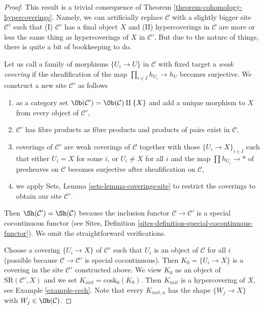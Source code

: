 \begin{proof}
This result is a trivial consequence of
Theorem \ref{theorem-cohomology-hypercoverings}.
Namely, we can artificially replace $\mathcal{C}$ with a slightly
bigger site $\mathcal{C}'$ such that
(I) $\mathcal{C}'$ has a final object $X$ and (II)
hypercoverings in $\mathcal{C}$ are more or less the
same thing as hypercoverings of $X$ in $\mathcal{C}'$.
But due to the nature of things, there is quite a bit of
bookkeeping to do.

\medskip\noindent
Let us call a family of morphisms $\{U_i \to U\}$ in $\mathcal{C}$
with fixed target a {\it weak covering} if the sheafification of the
map $\prod_{i \in I} h_{U_i} \to h_U$ becomes surjective.
We construct a new site $\mathcal{C}'$ as follows
\begin{enumerate}
\item as a category set $\Ob(\mathcal{C}') = \Ob(\mathcal{C}) \amalg \{X\}$
and add a unique morphism to $X$ from every object of $\mathcal{C}'$,
\item $\mathcal{C}'$ has fibre products as fibre products and products
of pairs exist in $\mathcal{C}$,
\item coverings of $\mathcal{C}'$ are weak coverings of $\mathcal{C}$
together with those $\{U_i \to X\}_{i \in I}$ such that either $U_i = X$
for some $i$, or $U_i \not = X$ for all $i$ and the map
$\prod h_{U_i} \to *$ of presheaves on $\mathcal{C}$ becomes
surjective after sheafification on $\mathcal{C}$,
\item we apply Sets, Lemma \ref{sets-lemma-coverings-site}
to restrict the coverings to obtain our site $\mathcal{C}'$.
\end{enumerate}
Then $\Sh(\mathcal{C}') = \Sh(\mathcal{C})$ because the inclusion
functor $\mathcal{C} \to \mathcal{C}'$ is a special cocontinuous functor
(see Sites, Definition \ref{sites-definition-special-cocontinuous-functor}).
We omit the straightforward verifications.

\medskip\noindent
Choose a covering $\{U_i \to X\}$ of $\mathcal{C}'$ such that $U_i$ is an
object of $\mathcal{C}$ for all $i$ (possible because
$\mathcal{C} \to \mathcal{C}'$ is special cocontinuous).
Then $K_0 = \{U_i \to X\}$ is a covering in the
site $\mathcal{C}'$ constructed above. We view $K_0$ as an object of
$\text{SR}(\mathcal{C}', X)$ and we set $K_{init} = \text{cosk}_0(K_0)$.
Then $K_{init}$ is a hypercovering of $X$, see
Example \ref{example-cech}. Note that every $K_{init, n}$ has the shape
$\{W_j \to X\}$ with $W_j \in \Ob(\mathcal{C})$.


\end{proof}
